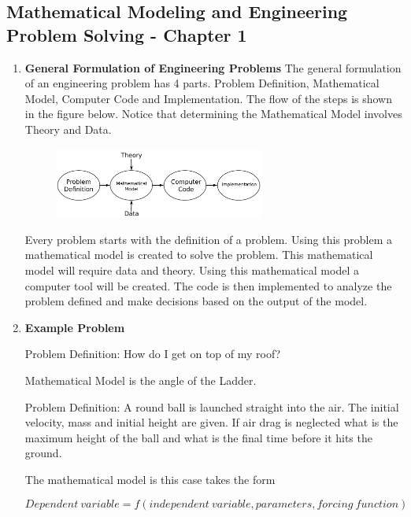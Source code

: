 \subsection{Mathematical Modeling and Engineering Problem Solving - Chapter 1}

\begin{enumerate}

  \item {\bf General Formulation of Engineering Problems}
    The general formulation of an engineering problem has 4
    parts. Problem Definition, Mathematical Model, Computer Code and
    Implementation. The flow of the steps is shown in the figure
    below. Notice that determining the Mathematical Model involves
    Theory and Data.
    \begin{figure}[htb]
      \begin{center}
        \includegraphics[height=0.25\textwidth,width=0.65\textwidth]{Graphics/Engineering_Problem.pdf}
      \end{center}
    \end{figure}
    Every problem starts with the definition of a problem. Using this
    problem a mathematical model is created to solve the problem. This
    mathematical model will require data and theory. Using this
    mathematical model a computer tool will be created. The code is
    then implemented to analyze the problem defined and make decisions
    based on the output of the model. 
    
  \item {\bf Example Problem}

    Problem Definition: How do I get on top of my roof? 

    Mathematical Model is the angle of the Ladder.
    
    Problem Definition: A round ball is launched straight into the
    air. The initial velocity, mass and initial height are given. If
    air drag is neglected what is the maximum height of the ball and
    what is the final time before it hits the ground.

    The mathematical model is this case takes the form

    \begin{equation}\nonumber
      Dependent~variable=f(independent~variable,parameters,forcing~function)
    \end{equation}


\end{enumerate}
